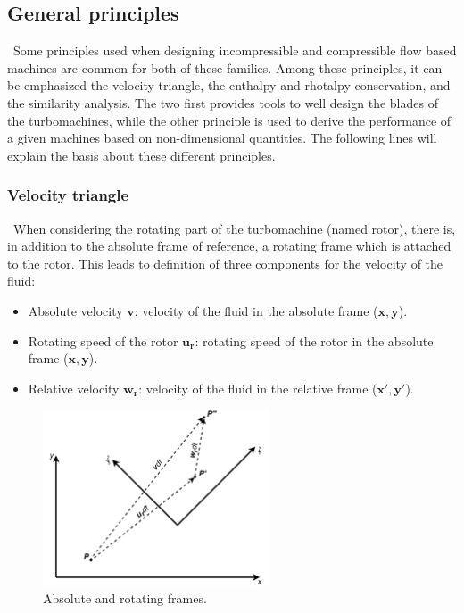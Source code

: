 \subsection{General principles}
\quad\ Some principles used when designing incompressible and compressible flow based machines are common for both of these families. Among these principles, it can be emphasized the velocity triangle, the enthalpy and rhotalpy conservation, and the similarity analysis. The two first provides tools to well design the blades of the turbomachines, while the other principle is used to derive the performance of a given machines based on non-dimensional quantities. The following lines will explain the basis about these different principles. 

\subsubsection{Velocity triangle}
\quad\ When considering the rotating part of the turbomachine (named rotor), there is, in addition to the absolute frame of reference, a rotating frame which is attached to the rotor. This leads to definition of three components for the velocity of the fluid: 

\begin{itemize}
    \item Absolute velocity \(\mathbf{v}\): velocity of the fluid in the absolute frame (\(\mathbf{x},\mathbf{y}\)).
    \item Rotating speed of the rotor \(\mathbf{u_r}\): rotating speed of the rotor in the absolute frame (\(\mathbf{x},\mathbf{y}\)).
    \item Relative velocity \(\mathbf{w_r}\): velocity of the fluid in the relative frame  (\(\mathbf{x'},\mathbf{y'}\)).
\end{itemize}

\begin{figure}[h]
    \centering
    \includegraphics[width=0.6\textwidth]{Frames.png}
    \caption{Absolute and rotating frames.}
    \label{fig:C3_frames}
\end{figure}

